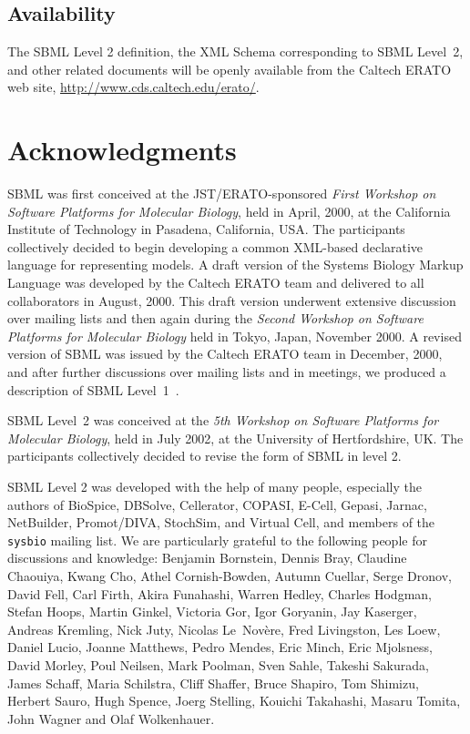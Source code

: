 \documentclass[10pt]{cekarticle}
\begin{document}
\subsection{Availability}
\label{sec:availability}

The SBML Level 2 definition, the XML Schema corresponding to SBML
Level~2, and other related documents will be openly available from the
Caltech ERATO web site, \url{http://www.cds.caltech.edu/erato/}.

\setcounter{secnumdepth}{-1}
\section{Acknowledgments}
\label{sec:acknowledgements}

SBML was first conceived at the JST/ERATO-sponsored \emph{First Workshop on
  Software Platforms for Molecular Biology}, held in April, 2000, at the
California Institute of Technology in Pasadena, California, USA.
The participants collectively decided to begin developing a common
XML-based declarative language for representing models.  A draft
version of the Systems Biology Markup Language was developed by
the Caltech ERATO team and delivered to all collaborators in
August, 2000.  This draft version underwent extensive discussion
over mailing lists and then again during the \emph{Second Workshop
on Software Platforms for Molecular Biology} held in Tokyo, Japan,
November 2000.  A revised version of SBML was issued by the
Caltech ERATO team in December, 2000, and after further
discussions over mailing lists and in meetings, we produced a
description of SBML Level~1~\citep{hucka:2001}.

SBML Level~2 was conceived at the \emph{5th Workshop on
Software Platforms for Molecular Biology}, held in July 2002, at
the University of Hertfordshire, UK.  The participants
collectively decided to revise the form of SBML in level 2.

SBML Level 2 was developed with the help of many people,
especially the authors of BioSpice, DBSolve, Cellerator, COPASI, E-Cell, Gepasi, Jarnac, NetBuilder, Promot/DIVA, StochSim, and Virtual Cell, and members of the \texttt{sysbio} mailing list.  We are particularly grateful to the following people for discussions and knowledge: Benjamin Bornstein, Dennis Bray, Claudine Chaouiya, Kwang Cho, Athel Cornish-Bowden, Autumn Cuellar, Serge Dronov, David Fell, Carl Firth, Akira Funahashi, Warren Hedley, Charles Hodgman, Stefan Hoops, Martin Ginkel, Victoria Gor, Igor Goryanin, Jay Kaserger, Andreas Kremling, Nick Juty, Nicolas Le~Nov\`{e}re, Fred Livingston, Les Loew, Daniel Lucio, Joanne Matthews, Pedro Mendes, Eric Minch, Eric Mjolsness, David Morley, Poul Neilsen, Mark Poolman, Sven Sahle, Takeshi Sakurada, James Schaff, Maria Schilstra, Cliff Shaffer, Bruce Shapiro, Tom Shimizu, Herbert Sauro, Hugh Spence, Joerg Stelling, Kouichi Takahashi, Masaru Tomita, John Wagner and Olaf Wolkenhauer.
\end{document}
